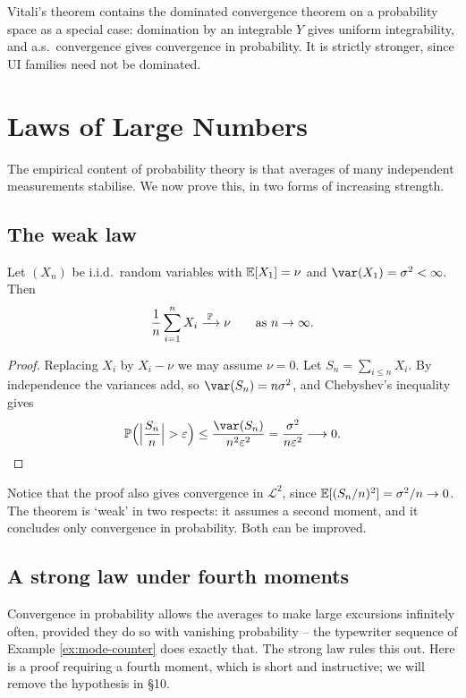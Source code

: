 \documentclass[a4paper]{scrartcl}
\newcommand{\cL}{\mathcal{L}}
\begin{document}
\begin{remark}
	Vitali's theorem contains the dominated convergence theorem on a probability space as a special case: domination by an integrable $Y$ gives uniform integrability, and a.s.\ convergence gives convergence in probability. It is strictly stronger, since UI families need not be dominated.
\end{remark}

\section{Laws of Large Numbers}

The empirical content of probability theory is that averages of many independent measurements stabilise. We now prove this, in two forms of increasing strength.

\subsection{The weak law}

\begin{theorem}\label{thm:wlln}
	Let $(X_n)$ be i.i.d.\ random variables with $\mathbb{E}[X_1]=\nu$ and $\var(X_1)=\sigma^2<\infty$. Then
	$$
	\frac{1}{n}\sum_{i=1}^n X_i \xrightarrow{\;\mathbb{P}\;} \nu \qquad \text{as } n \to\infty.
	$$
\end{theorem}
\begin{proof}
	Replacing $X_i$ by $X_i - \nu$ we may assume $\nu=0$. Let $S_n = \sum_{i\leq n}X_i$. By independence the variances add, so $\var(S_n) = n\sigma^2$, and Chebyshev's inequality gives
	$$
	\PP\Big( \Big|\frac{S_n}{n}\Big|>\varepsilon\Big) \leq \frac{\var(S_n)}{n^2\varepsilon^2}=\frac{\sigma^2}{n\varepsilon^2}\longrightarrow 0. \qedhere
	$$
\end{proof}

Notice that the proof also gives convergence in $\cL^2$, since $\mathbb{E}[(S_n/n)^2]=\sigma^2/n\to0$. The theorem is `weak' in two respects: it assumes a second moment, and it concludes only convergence in probability. Both can be improved.

\subsection{A strong law under fourth moments}

Convergence in probability allows the averages to make large excursions infinitely often, provided they do so with vanishing probability -- the typewriter sequence of Example \ref{ex:mode-counter} does exactly that. The strong law rules this out. Here is a proof requiring a fourth moment, which is short and instructive; we will remove the hypothesis in \S10.
\end{document}
